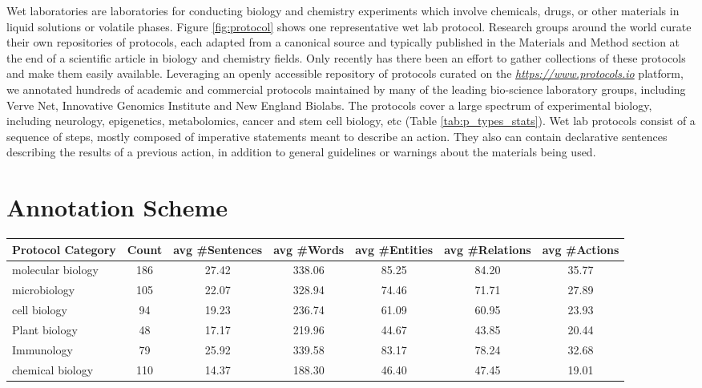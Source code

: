 \documentclass[11pt,a4paper]{article}
\begin{document}
Wet laboratories are laboratories for conducting biology and chemistry experiments which involve chemicals, drugs, or other materials in liquid solutions or volatile phases. Figure \ref{fig:protocol} shows one representative wet lab protocol. Research groups around the world curate their own repositories of protocols, each adapted from a canonical source and typically published in the Materials and Method section at the end of a scientific article in biology and chemistry fields. Only recently has there been an effort to gather collections of these protocols and make them easily available. Leveraging an openly accessible repository of protocols curated on the \href{https://www.protocols.io}{\textit{https://www.protocols.io}} platform, we annotated hundreds of academic and commercial protocols maintained by many of the leading bio-science laboratory groups, including Verve Net, Innovative Genomics Institute and New England Biolabs. The protocols cover a large spectrum of experimental biology, including neurology, epigenetics, metabolomics, cancer and stem cell biology, etc (Table \ref{tab:p_types_stats}). Wet lab protocols consist of a sequence of steps, mostly composed of imperative statements meant to describe an action. They also can contain declarative sentences describing the results of a previous action, in addition to general guidelines or warnings about the materials being used. 



\section{Annotation Scheme}



\begin{table*}[]
\centering
\small
\begin{tabular}{|l||c|c|c|c|c|c|}
\hline
Protocol Category & Count & avg \#Sentences & avg \#Words     & avg \#Entities  & avg \#Relations & avg \#Actions   \\
\hline
molecular biology & 186   & 27.42   & 338.06 & 85.25  & 84.20   & 35.77 \\
microbiology      & 105   & 22.07 & 328.94  & 74.46  & 71.71  & 27.89 \\
cell biology      & 94    & 19.23  & 236.74 & 61.09  & 60.95   & 23.93 \\
Plant biology     & 48    & 17.17 & 219.96 & 44.67 & 43.85 & 20.44            \\
Immunology        & 79    & 25.92 & 339.58  & 83.17  & 78.24  & 32.68  \\
chemical biology  & 110   & 14.37 & 188.30  & 46.40   & 47.45 & 19.01 \\
\hline
\end{tabular}
\caption{Statistics of our Wet Lab Protocol Corpus by protocol category.}
    \label{tab:p_types_stats}
\end{table*}
\end{document}
